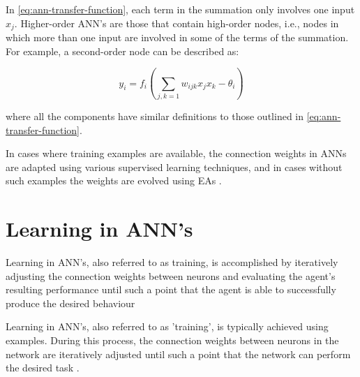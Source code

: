 In \ref{eq:ann-transfer-function}, each term in the summation only involves one input $x_j$. Higher-order ANN's are those that contain high-order nodes, i.e., nodes in which more than one input are involved in some of the terms of the summation. For example, a second-order node can be described as:

\begin{equation} \label{eq:higher-order-node}
	y_i = f_i (\sum_{{j,k}=1} w_{ijk}x_jx_k - \theta_i)
\end{equation}

where all the components have similar definitions to those outlined in \ref{eq:ann-transfer-function}.


In cases where training examples are available, the connection weights in ANNs are adapted using various supervised learning techniques, and in cases without such examples the weights are evolved using EAs \cite{dayhoff2001artificial,RefWorks:1}.




\section{Learning in ANN's}

Learning in ANN's, also referred to as training, is accomplished by iteratively adjusting the connection weights between neurons and evaluating the agent's resulting performance until such a point that the agent is able to successfully produce the desired behaviour

Learning in ANN's, also referred to as 'training', is typically achieved using examples. During this process, the connection weights between neurons in the network are iteratively adjusted until such a point that the network can perform the desired task \cite{XinYao1999}.


